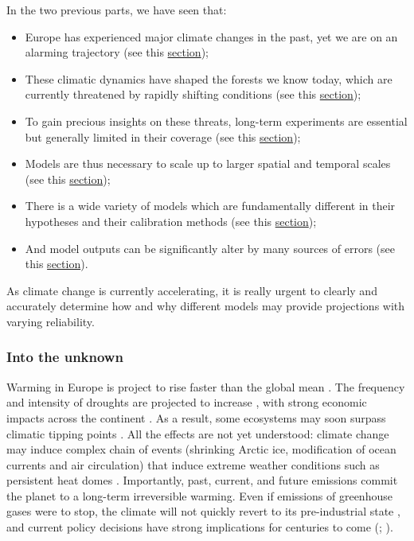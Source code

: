 In the two previous parts, we have seen that:
\begin{itemize}
\item Europe has experienced major climate changes in the past, yet we are on an alarming trajectory (see this \hyperref[sec:climate]{section}); 
\item These climatic dynamics have shaped the forests we know today, which are currently threatened by rapidly shifting conditions (see this \hyperref[sec:forest]{section});
\item To gain precious insights on these threats, long-term experiments are essential but generally limited in their coverage (see this \hyperref[sec:experiment]{section});
\item Models are thus necessary to scale up to larger spatial and temporal scales (see this \hyperref[sec:model]{section});
\item There is a wide variety of models which are fundamentally different in their hypotheses and their calibration methods (see this \hyperref[sec:approach]{section});
\item And model outputs can be significantly alter by many sources of errors (see this \hyperref[sec:error]{section}).
\end{itemize}

\noindent As climate change is currently accelerating, it is really urgent to clearly and accurately determine how and why different models may provide projections with varying reliability.

\subsubsection{Into the unknown}

Warming in Europe is project to rise faster than the global mean \citep{IPCC2021}. The frequency and intensity of droughts are projected to increase \citep{Berg2016}, with strong economic impacts across the continent \citep{Naumann2021}. As a result, some ecosystems may soon surpass climatic tipping points \citep{Fewster2022}. All the effects are not yet understood: climate change may induce complex chain of events (shrinking Arctic ice, modification of ocean currents and air circulation) that induce extreme weather conditions such as persistent heat domes \citep{Oltmanns2024}. Importantly, past, current, and future emissions commit the planet to a long-term irreversible warming. Even if emissions of greenhouse gases were to stop, the climate will not quickly revert to its pre-industrial state \citep{Zickfeld2013}, and current policy decisions have strong implications for centuries to come (; \citealp{Clark2016}).


